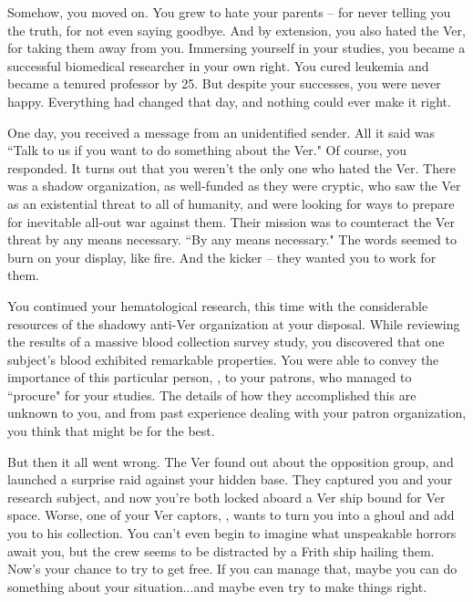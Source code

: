 \documentclass[char]{guildcamp4}
\begin{document}
Somehow, you moved on. You grew to hate your parents -- for never telling you the truth, for not even saying goodbye. And by extension, you also hated the Ver, for taking them away from you. Immersing yourself in your studies, you became a successful biomedical researcher in your own right. You cured leukemia and became a tenured professor by 25. But despite your successes, you were never happy. Everything had changed that day, and nothing could ever make it right.

One day, you received a message from an unidentified sender. All it said was ``Talk to us if you want to do something about the Ver." Of course, you responded. It turns out that you weren't the only one who hated the Ver. There was a shadow organization, as well-funded as they were cryptic, who saw the Ver as an existential threat to all of humanity, and were looking for ways to prepare for inevitable all-out war against them. Their mission was to counteract the Ver threat by any means necessary. ``By any means necessary." The words seemed to burn on your display, like fire. And the kicker -- they wanted you to work for them.

You continued your hematological research, this time with the considerable resources of the shadowy anti-Ver organization at your disposal. While reviewing the results of a massive blood collection survey study, you discovered that one subject's blood exhibited remarkable properties. You were able to convey the importance of this particular person, \cPlead{\MYname}, to your patrons, who managed to ``procure"  for your studies. The details of how they accomplished this are unknown to you, and from past experience dealing with your patron organization, you think that might be for the best.

But then it all went wrong. The Ver found out about the opposition group, and launched a surprise raid against your hidden base. They captured you and your research subject, and now you're both locked aboard a Ver ship bound for Ver space. Worse, one of your Ver captors, \cVone{}, wants to turn you into a ghoul and add you to his collection. You can't even begin to imagine what unspeakable horrors await you, but the crew seems to be distracted by a Frith ship hailing them. Now's your chance to try to get free. If you can manage that, maybe you can do something about your situation...and maybe even try to make things right.
\end{document}
